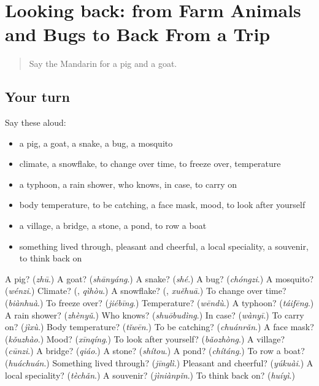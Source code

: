 \section[(dialogue)]{Looking back: from Farm Animals and Bugs to Back From a Trip}

\label{lesson:ZH-R247-review-242-247}



\begin{quote}
Say the Mandarin for a pig and a goat.
\end{quote}

\subsection*{Your turn}
Say these aloud:

\begin{itemize}
\raggedright
  \item a pig, a goat, a snake, a bug, a mosquito
  \item climate, a snowflake, to change over time, to freeze over, temperature
  \item a typhoon, a rain shower, who knows, in case, to carry on
  \item body temperature, to be catching, a face mask, mood, to look after yourself
  \item a village, a bridge, a stone, a pond, to row a boat
  \item something lived through, pleasant and cheerful, a local speciality, a souvenir, to think back on
\end{itemize}

\begin{tcolorbox}[breakable,colback=teal!4,colframe=teal!35!black,title={Before you move on}]
A pig? (\emph{zhū}.) A goat? (\emph{shānyáng}.) A snake? (\emph{shé}.) A bug? (\emph{chóngzi}.) A mosquito? (\emph{wénzi}.) Climate? (\textbf{}, \emph{qìhòu}.) A snowflake? (\textbf{}, \emph{xuěhuā}.) To change over time? (\emph{biànhuà}.) To freeze over? (\emph{jiébīng}.) Temperature? (\emph{wēndù}.) A typhoon? (\emph{táifēng}.) A rain shower? (\emph{zhènyǔ}.) Who knows? (\emph{shuōbudìng}.) In case? (\emph{wànyī}.) To carry on? (\emph{jìxù}.) Body temperature? (\emph{tǐwēn}.) To be catching? (\emph{chuánrǎn}.) A face mask? (\emph{kǒuzhào}.) Mood? (\emph{xīnqíng}.) To look after yourself? (\emph{bǎozhòng}.) A village? (\emph{cūnzi}.) A bridge? (\emph{qiáo}.) A stone? (\emph{shítou}.) A pond? (\emph{chítáng}.) To row a boat? (\emph{huáchuán}.) Something lived through? (\emph{jīnglì}.) Pleasant and cheerful? (\emph{yúkuài}.) A local speciality? (\emph{tèchǎn}.) A souvenir? (\emph{jìniànpǐn}.) To think back on? (\emph{huíyì}.)
\end{tcolorbox}
